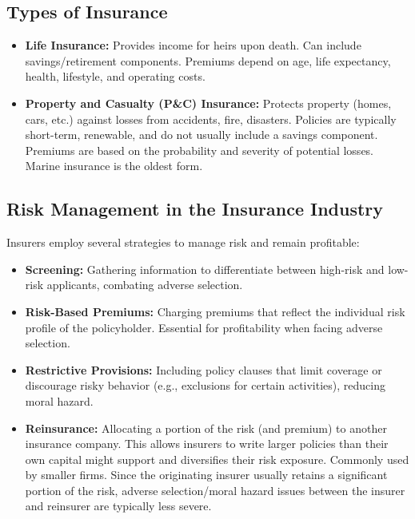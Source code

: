 \subsection{Types of Insurance}
\begin{itemize}
    \item \textbf{Life Insurance:} Provides income for heirs upon death. Can include savings/retirement components. Premiums depend on age, life expectancy, health, lifestyle, and operating costs.
    \item \textbf{Property and Casualty (P\&C) Insurance:} Protects property (homes, cars, etc.) against losses from accidents, fire, disasters. Policies are typically short-term, renewable, and do not usually include a savings component. Premiums are based on the probability and severity of potential losses. Marine insurance is the oldest form.
\end{itemize}

\subsection{Risk Management in the Insurance Industry}
Insurers employ several strategies to manage risk and remain profitable:
\begin{itemize}
    \item \textbf{Screening:} Gathering information to differentiate between high-risk and low-risk applicants, combating adverse selection.
    \item \textbf{Risk-Based Premiums:} Charging premiums that reflect the individual risk profile of the policyholder. Essential for profitability when facing adverse selection.
    \item \textbf{Restrictive Provisions:} Including policy clauses that limit coverage or discourage risky behavior (e.g., exclusions for certain activities), reducing moral hazard.
    \item \textbf{Reinsurance:} Allocating a portion of the risk (and premium) to another insurance company. This allows insurers to write larger policies than their own capital might support and diversifies their risk exposure. Commonly used by smaller firms. Since the originating insurer usually retains a significant portion of the risk, adverse selection/moral hazard issues between the insurer and reinsurer are typically less severe.
\end{itemize}


